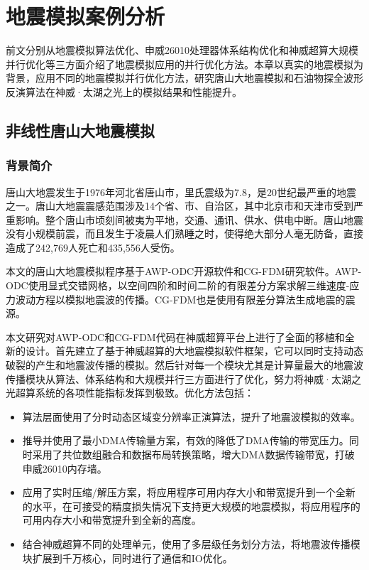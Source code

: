 \chapter{地震模拟案例分析} %
\label{cha:地震模拟案例分析}

前文分别从地震模拟算法优化、申威26010处理器体系结构优化和神威超算大规模并行优化等三方面介绍了地震模拟应用的并行优化方法。本章以真实的地震模拟为背景，应用不同的地震模拟并行优化方法，研究唐山大地震模拟和石油物探全波形反演算法在神威·太湖之光上的模拟结果和性能提升。

\section{非线性唐山大地震模拟}

\subsection{背景简介}

唐山大地震发生于1976年河北省唐山市，里氏震级为7.8，是20世纪最严重的地震之一。唐山大地震震感范围涉及14个省、市、自治区，其中北京市和天津市受到严重影响。整个唐山市顷刻间被夷为平地，交通、通讯、供水、供电中断。唐山地震没有小规模前震，而且发生于凌晨人们熟睡之时，使得绝大部分人毫无防备，直接造成了242,769人死亡和435,556人受伤。

本文的唐山大地震模拟程序基于AWP-ODC\cite{cui2010scalable}开源软件和CG-FDM\citep{zhang2014three}研究软件。AWP-ODC使用显式交错网格，以空间四阶和时间二阶的有限差分方案求解三维速度-应力波动方程以模拟地震波的传播。CG-FDM也是使用有限差分算法生成地震的震源。

本文研究对AWP-ODC和CG-FDM代码在神威超算平台上进行了全面的移植和全新的设计。首先建立了基于神威超算的大地震模拟软件框架，它可以同时支持动态破裂的产生和地震波传播的模拟。然后针对每一个模块尤其是计算量最大的地震波传播模块从算法、体系结构和大规模并行三方面进行了优化，努力将神威·太湖之光超算系统的各项性能指标发挥到极致。优化方法包括：
\begin{itemize}
  \item 算法层面使用了分时动态区域变分辨率正演算法，提升了地震波模拟的效率。
  \item 推导并使用了最小DMA传输量方案，有效的降低了DMA传输的带宽压力。同时采用了共位数组融合和数据布局转换策略，增大DMA数据传输带宽，打破申威26010内存墙。
  \item 应用了实时压缩/解压方案，将应用程序可用内存大小和带宽提升到一个全新的水平，在可接受的精度损失情况下支持更大规模的地震模拟，将应用程序的可用内存大小和带宽提升到全新的高度。
  \item 结合神威超算不同的处理单元，使用了多层级任务划分方法，将地震波传播模块扩展到千万核心，同时进行了通信和IO优化。
\end{itemize}

